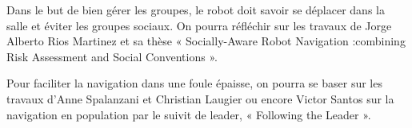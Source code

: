 Dans le but de bien gérer les groupes, le robot doit savoir se déplacer dans la salle et éviter les groupes sociaux. On pourra réfléchir sur les travaux de Jorge Alberto Rios Martinez et sa thèse « Socially-Aware Robot Navigation :combining Risk Assessment and Social Conventions ».

Pour faciliter la navigation dans une foule épaisse, on pourra se baser sur les travaux d’Anne Spalanzani et Christian Laugier ou encore Victor Santos sur la navigation en population par le suivit de leader, « Following the Leader ».


